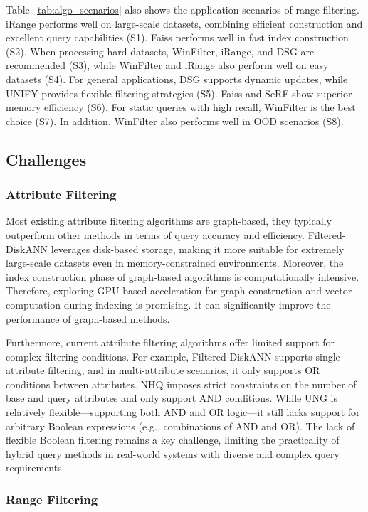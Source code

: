 \documentclass[sigconf, nonacm]{acmart}
\begin{document}
	Table~\ref{tab:algo_scenarios} also shows the application scenarios of range filtering. iRange performs well on large-scale datasets, combining efficient construction and excellent query capabilities (S1). Faiss performs well in fast index construction (S2). When processing hard datasets, WinFilter, iRange, and DSG are recommended (S3), while WinFilter and iRange also perform well on easy datasets (S4). For general applications, DSG supports dynamic updates, while UNIFY provides flexible filtering strategies (S5). Faiss and SeRF show superior memory efficiency (S6). For static queries with high recall, WinFilter is the best choice (S7). In addition, WinFilter also performs well in OOD scenarios (S8).
	\subsection{Challenges}
	\subsubsection{\textbf{Attribute Filtering}}
	Most existing attribute filtering algorithms are graph-based, they typically outperform other methods in terms of query accuracy and efficiency. Filtered-DiskANN leverages disk-based storage, making it more suitable for extremely large-scale datasets even in memory-constrained environments. Moreover, the index construction phase of graph-based algorithms is computationally intensive. Therefore, exploring GPU-based acceleration for graph construction and vector computation during indexing is promising. It can significantly improve the performance of graph-based methods.
	
	Furthermore, current attribute filtering algorithms offer limited support for complex filtering conditions. For example, Filtered-DiskANN  supports single-attribute filtering, and in multi-attribute scenarios, it only supports OR conditions between attributes. 
	NHQ imposes strict constraints on the number of base and query attributes and only support AND conditions. While UNG is relatively flexible—supporting both AND and OR logic—it still lacks support for arbitrary Boolean expressions (e.g., combinations of AND and OR). The lack of flexible Boolean filtering remains a key challenge, limiting the practicality of hybrid query methods in real-world systems with diverse and complex query requirements.
	
	\subsubsection{\textbf{Range Filtering}}
	
\end{document}
